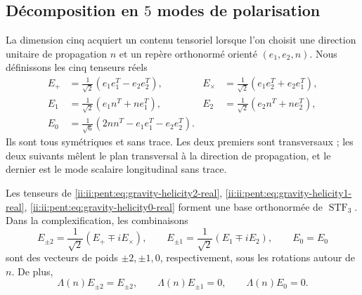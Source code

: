 \subsection{Décomposition en \(5\) modes de polarisation}

La dimension cinq acquiert un contenu tensoriel lorsque l’on choisit une direction
unitaire de propagation \(n\) et un repère orthonormé orienté
\((e_1,e_2,n)\). Nous définissons les cinq tenseurs réels
\begin{align}
E_{+}&=\frac1{\sqrt2}(e_1e_1^T-e_2e_2^T),
&E_{\times}&=\frac1{\sqrt2}(e_1e_2^T+e_2e_1^T),
\label{ii:ii:pent:eq:gravity-helicity2-real}\\
E_{1}&=\frac1{\sqrt2}(e_1n^T+ne_1^T),
&E_{2}&=\frac1{\sqrt2}(e_2n^T+ne_2^T),
\label{ii:ii:pent:eq:gravity-helicity1-real}\\
E_{0}&=\frac1{\sqrt6}(2nn^T-e_1e_1^T-e_2e_2^T).
\label{ii:ii:pent:eq:gravity-helicity0-real}
\end{align}
Ils sont tous symétriques et sans trace. Les deux premiers sont transversaux ; les
deux suivants mêlent le plan transversal à la direction de
propagation, et le dernier est le mode scalaire longitudinal sans trace.

\begin{theorem}
\label{ii:ii:pent:thm:gravity-five-helicities}
Les tenseurs de
\eqref{ii:ii:pent:eq:gravity-helicity2-real}, \eqref{ii:ii:pent:eq:gravity-helicity1-real}, \eqref{ii:ii:pent:eq:gravity-helicity0-real}
forment une base orthonormée de \(\operatorname{STF}_3\). Dans la
complexification, les combinaisons
\begin{equation}
\label{ii:ii:pent:eq:gravity-complex-helicities}
E_{\pm2}=\frac1{\sqrt2}(E_+\mp i E_\times),
\qquad
E_{\pm1}=\frac1{\sqrt2}(E_1\mp i E_2),
\qquad E_0=E_0
\end{equation}
sont des vecteurs de poids \(\pm2,\pm1,0\), respectivement, sous les rotations
autour de \(n\). De plus,
\begin{equation}
\label{ii:ii:pent:eq:gravity-tt-on-five}
\Lambda(n)E_{\pm2}=E_{\pm2},
\qquad
\Lambda(n)E_{\pm1}=0,
\qquad
\Lambda(n)E_0=0.
\end{equation}
\end{theorem}

